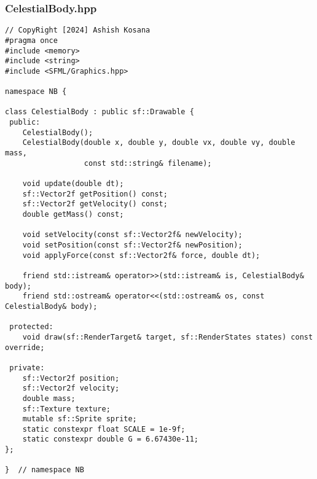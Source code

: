 \documentclass[12pt]{article}
\begin{document}
\subsubsection{CelestialBody.hpp}
\begin{lstlisting}[style=cppcode]
// CopyRight [2024] Ashish Kosana
#pragma once
#include <memory>
#include <string>
#include <SFML/Graphics.hpp>

namespace NB {

class CelestialBody : public sf::Drawable {
 public:
    CelestialBody();
    CelestialBody(double x, double y, double vx, double vy, double mass,
                  const std::string& filename);

    void update(double dt);
    sf::Vector2f getPosition() const;
    sf::Vector2f getVelocity() const;
    double getMass() const;

    void setVelocity(const sf::Vector2f& newVelocity);
    void setPosition(const sf::Vector2f& newPosition);
    void applyForce(const sf::Vector2f& force, double dt);

    friend std::istream& operator>>(std::istream& is, CelestialBody& body);
    friend std::ostream& operator<<(std::ostream& os, const CelestialBody& body);

 protected:
    void draw(sf::RenderTarget& target, sf::RenderStates states) const override;

 private:
    sf::Vector2f position;
    sf::Vector2f velocity;
    double mass;
    sf::Texture texture;
    mutable sf::Sprite sprite;
    static constexpr float SCALE = 1e-9f;
    static constexpr double G = 6.67430e-11;
};

}  // namespace NB

\end{lstlisting}
\end{document}
